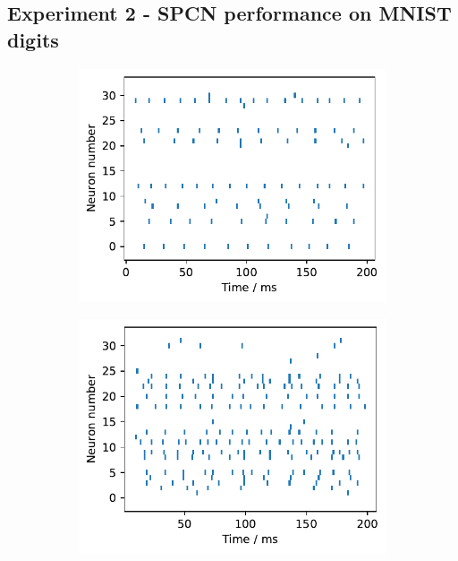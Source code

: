 \documentclass[a4paper,11pt]{article}
\begin{document}
\subsection{Experiment 2 - SPCN performance on MNIST digits}
\begin{figure}[ht]
  \begin{subfigure}[t]{0.32\columnwidth}
    \includegraphics[width=\linewidth]{graphics/spikes_0.pdf}  
  \end{subfigure}
  \hfill
  \begin{subfigure}[t]{0.32\columnwidth}
    \includegraphics[width=\linewidth]{graphics/spikes_1.pdf}  
  \end{subfigure}
  \hfill
  \begin{subfigure}[t]{0.32\columnwidth}

\end{subfigure}
\end{figure}
\end{document}
